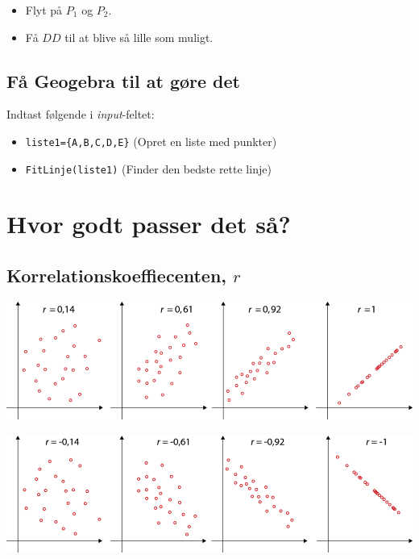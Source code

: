 \documentclass[11pt]{article}
\begin{document}
\begin{itemize}
\item Flyt på \(P_1\) og \(P_2\).
\item Få \(DD\) til at blive så lille som muligt.
\end{itemize}

\subsection*{Få Geogebra til at gøre det}
\label{sec:org634a361}

Indtast følgende i \emph{input}-feltet:

\begin{itemize}
\item \texttt{liste1=\{A,B,C,D,E\}} (Opret en liste med punkter)
\item \texttt{FitLinje(liste1)} (Finder den bedste rette linje)
\end{itemize}

\section*{Hvor godt passer det så?}
\label{sec:org44a4a10}

\subsection*{Korrelationskoeffiecenten, \(r\)}
\label{sec:org18da27b}

\begin{center}
\includegraphics[width=.9\linewidth]{img/csm_123_rverdi_9467cbf6c5_2019-09-05_10-53-12.png}
\end{center}

\begin{center}
\includegraphics[width=.9\linewidth]{img/csm_124_rverdi_spejl_b07c3ce819_2019-09-05_10-53-33.png}
\end{center}
\end{document}
